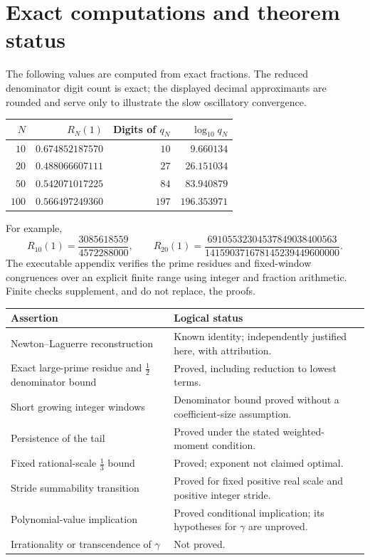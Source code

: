 \documentclass[11pt,a4paper]{article}
\theoremstyle{definition}
\theoremstyle{remark}
\numberwithin{equation}{section}
\begin{document}
\section{Exact computations and theorem status}
\label{sample:sec:computation}
The following values are computed from exact fractions. The reduced
denominator digit count is exact; the displayed decimal approximants
are rounded and serve only to illustrate the slow oscillatory
convergence.
\begin{center}
\begin{tabular}{@{}r r r r@{}}
\toprule
$N$ & $R_N(1)$ & Digits of $q_N$ & $\log_{10}q_N$ \\
\midrule
$10$ & $0.674852187570$ & $10$ & $9.660134$ \\
$20$ & $0.488066607111$ & $27$ & $26.151034$ \\
$50$ & $0.542071017225$ & $84$ & $83.940879$ \\
$100$ & $0.566497249360$ & $197$ & $196.353971$ \\
\bottomrule
\end{tabular}
\end{center}
For example,
\[
R_{10}(1)=\frac{3085618559}{4572288000},\qquad
R_{20}(1)=
\frac{69105532304537849038400563}{141590371678145239449600000}.
\]
The executable appendix verifies the prime residues and fixed-window
congruences over an explicit finite range using integer and fraction
arithmetic. Finite checks supplement, and do not replace, the proofs.

\begin{center}\small
\begin{tabularx}{\linewidth}{@{}p{.43\linewidth}X@{}}
\toprule
Assertion & Logical status \\
\midrule
Newton--Laguerre reconstruction & Known identity; independently
justified here, with attribution. \\
Exact large-prime residue and $\frac12$ denominator bound & Proved,
including reduction to lowest terms. \\
Short growing integer windows & Denominator bound proved without a
coefficient-size assumption. \\
Persistence of the tail & Proved under the stated weighted-moment
condition. \\
Fixed rational-scale $\frac13$ bound & Proved; exponent not claimed
optimal. \\
Stride summability transition & Proved for fixed positive real scale
and positive integer stride. \\
Polynomial-value implication & Proved conditional implication;
its hypotheses for $\gamma$ are unproved. \\
Irrationality or transcendence of $\gamma$ & Not proved. \\
\bottomrule
\end{tabularx}
\end{center}
\end{document}
